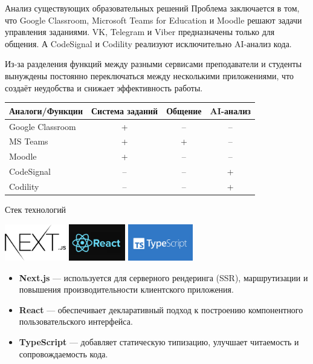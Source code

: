 \documentclass[aspectratio=169]{beamer}
\begin{document}
\begin{frame}{Анализ существующих образовательных решений}
\small
\justifying
Проблема заключается в том, что Google Classroom, Microsoft Teams for Education и Moodle решают задачи управления заданиями. VK, Telegram и Viber предназначены только для общения. А CodeSignal и Codility реализуют исключительно AI-анализ кода.

\vspace{0.8em}

Из-за разделения функций между разными сервисами преподаватели и студенты вынуждены постоянно переключаться между несколькими приложениями, что создаёт неудобства и снижает эффективность работы.

\vspace{1em}

\centering
\begin{tabular}{lccc}
\hline
\textbf{Аналоги/Функции} & Система заданий & Общение & AI-анализ \\
\hline
Google Classroom & + & -- & -- \\
MS Teams         & + & +  & -- \\
Moodle           & + & -- & -- \\
CodeSignal       & -- & -- & +  \\
Codility         & -- & -- & +  \\
\hline
\end{tabular}
\end{frame}

\begin{frame}{Стек технологий}

\centering
\includegraphics[height=1.6cm]{static/nextjs-logo.png} \hspace{1cm}
\includegraphics[height=1.6cm]{static/react-logo.png} \hspace{1cm}
\includegraphics[height=1.6cm]{static/typescript-logo.png}

\vspace{1.5em}
\small
\begin{itemize}
  \item \textbf{Next.js} — используется для серверного рендеринга (SSR), маршрутизации и повышения производительности клиентского приложения.
  \item \textbf{React} — обеспечивает декларативный подход к построению компонентного пользовательского интерфейса.
  \item \textbf{TypeScript} — добавляет статическую типизацию, улучшает читаемость и сопровождаемость кода.
\end{itemize}
\end{frame}
\end{document}
